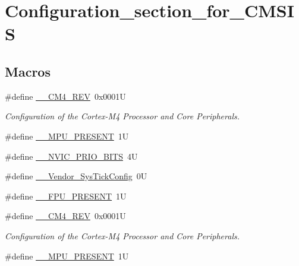 \hypertarget{group___configuration__section__for___c_m_s_i_s}{}\section{Configuration\+\_\+section\+\_\+for\+\_\+\+C\+M\+S\+IS}
\label{group___configuration__section__for___c_m_s_i_s}
\subsection*{Macros}
\begin{DoxyCompactItemize}
\item 
\#define \hyperlink{group___configuration__section__for___c_m_s_i_s_ga45a97e4bb8b6ce7c334acc5f45ace3ba}{\+\_\+\+\_\+\+C\+M4\+\_\+\+R\+EV}~0x0001U
\begin{DoxyCompactList}\small\item\em Configuration of the Cortex-\/\+M4 Processor and Core Peripherals. \end{DoxyCompactList}\item 
\#define \hyperlink{group___configuration__section__for___c_m_s_i_s_ga4127d1b31aaf336fab3d7329d117f448}{\+\_\+\+\_\+\+M\+P\+U\+\_\+\+P\+R\+E\+S\+E\+NT}~1U
\item 
\#define \hyperlink{group___configuration__section__for___c_m_s_i_s_gae3fe3587d5100c787e02102ce3944460}{\+\_\+\+\_\+\+N\+V\+I\+C\+\_\+\+P\+R\+I\+O\+\_\+\+B\+I\+TS}~4U
\item 
\#define \hyperlink{group___configuration__section__for___c_m_s_i_s_gab58771b4ec03f9bdddc84770f7c95c68}{\+\_\+\+\_\+\+Vendor\+\_\+\+Sys\+Tick\+Config}~0U
\item 
\#define \hyperlink{group___configuration__section__for___c_m_s_i_s_gac1ba8a48ca926bddc88be9bfd7d42641}{\+\_\+\+\_\+\+F\+P\+U\+\_\+\+P\+R\+E\+S\+E\+NT}~1U
\item 
\#define \hyperlink{group___configuration__section__for___c_m_s_i_s_ga45a97e4bb8b6ce7c334acc5f45ace3ba}{\+\_\+\+\_\+\+C\+M4\+\_\+\+R\+EV}~0x0001U
\begin{DoxyCompactList}\small\item\em Configuration of the Cortex-\/\+M4 Processor and Core Peripherals. \end{DoxyCompactList}\item 
\#define \hyperlink{group___configuration__section__for___c_m_s_i_s_ga4127d1b31aaf336fab3d7329d117f448}{\+\_\+\+\_\+\+M\+P\+U\+\_\+\+P\+R\+E\+S\+E\+NT}~1U

\end{DoxyCompactItemize}
